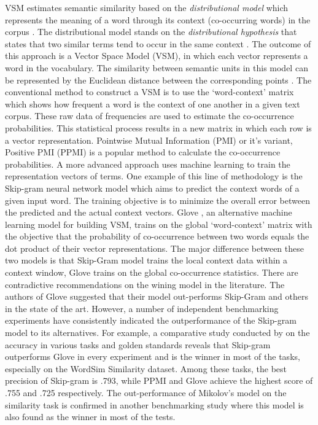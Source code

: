 \documentclass[Journal, BackFigs,NoLists, DoubleSpace]{ascelike}%
\begin{document}
VSM estimates semantic similarity based on the \textit{distributional model} which represents the meaning of a word through its context (co-occurring words) in the corpus \cite{erk12}. The distributional model stands on the \textit{distributional hypothesis} that states that two similar terms tend to occur in the same context \cite{Harris54}. The outcome of this approach is a Vector Space Model (VSM), in which each vector represents a word in the vocabulary. The similarity between semantic units in this model can be represented by the Euclidean distance between the corresponding points \cite{erk12}. The conventional method to construct a VSM is to use the `word-context' matrix which shows how frequent a word is the context of one another in a given text corpus. These raw data of frequencies are used to estimate the co-occurrence probabilities. This statistical process results in a new matrix in which each row is a vector representation. Pointwise Mutual Information (PMI) \cite{church90} or it's variant, Positive PMI (PPMI) is a popular method to calculate the co-occurrence probabilities. A more advanced approach uses machine learning to train the representation vectors of terms. One example of this line of methodology is the Skip-gram neural network model \cite{mikolov13a} which aims to predict the context words of a given input word. The training objective is to minimize the overall error between the predicted and the actual context vectors. Glove \cite{pennington2014glove}, an alternative machine learning model for building VSM, trains on the global `word-context' matrix with the objective that the probability of co-occurrence between two words equals the dot product of their vector representations. The major difference between these two models is that Skip-Gram model trains the local context data within a context window, Glove trains on the global co-occurrence statistics. There are contradictive recommendations on the wining model in the literature. The authors of Glove suggested that their model out-performs Skip-Gram and others in the state of the art. However, a number of independent benchmarking experiments have consistently indicated the outperformance of the Skip-gram model to its alternatives. For example, a comparative study conducted by  on the accuracy in various tasks and golden standards reveals that Skip-gram outperforms Glove in every experiment and is the winner in most of the tasks, especially on the WordSim Similarity dataset. Among these tasks, the best precision of Skip-gram is .793, while PPMI and Glove achieve the highest score of .755 and .725 respectively.  The out-performance of Mikolov's model on the similarity task is confirmed in another benchmarking study \cite{hill15} where this model is also found as the winner in most of the tests. 
\end{document}
